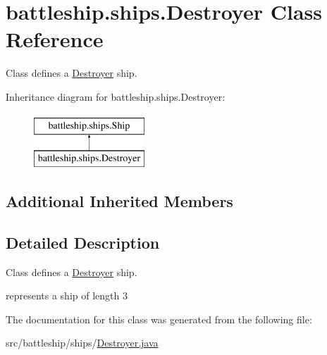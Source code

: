 \hypertarget{classbattleship_1_1ships_1_1Destroyer}{}\section{battleship.\+ships.\+Destroyer Class Reference}
\label{classbattleship_1_1ships_1_1Destroyer}


Class defines a \hyperlink{classbattleship_1_1ships_1_1Destroyer}{Destroyer} ship.  


Inheritance diagram for battleship.\+ships.\+Destroyer\+:\begin{figure}[H]
\begin{center}
\leavevmode
\includegraphics[height=2.000000cm]{classbattleship_1_1ships_1_1Destroyer}
\end{center}
\end{figure}
\subsection*{Additional Inherited Members}


\subsection{Detailed Description}
Class defines a \hyperlink{classbattleship_1_1ships_1_1Destroyer}{Destroyer} ship. 

represents a ship of length 3 

The documentation for this class was generated from the following file\+:\begin{DoxyCompactItemize}
\item 
src/battleship/ships/\hyperlink{Destroyer_8java}{Destroyer.\+java}\end{DoxyCompactItemize}
